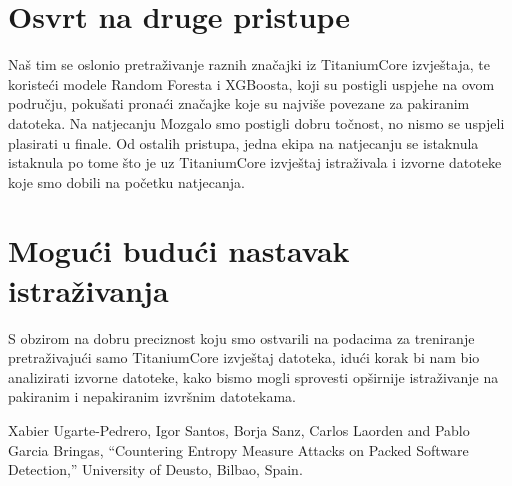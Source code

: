 \documentclass[conference]{IEEEtran}
\begin{document}
\section{Osvrt na druge pristupe}
Naš tim se oslonio pretraživanje raznih značajki iz TitaniumCore izvještaja, te koristeći modele Random Foresta i XGBoosta, koji su postigli uspjehe na ovom području, pokušati pronaći značajke koje su najviše povezane za pakiranim datoteka. Na natjecanju Mozgalo smo postigli dobru točnost, no nismo se uspjeli plasirati u finale. Od ostalih pristupa, jedna ekipa na natjecanju se istaknula istaknula po tome što je uz TitaniumCore izvještaj istraživala i  izvorne datoteke koje smo dobili na početku natjecanja.
\section{Mogući budući nastavak istraživanja}
S obzirom na dobru preciznost koju smo ostvarili na podacima za treniranje pretraživajući samo TitaniumCore izvještaj datoteka, idući korak bi nam bio analizirati izvorne datoteke, kako bismo mogli sprovesti opširnije istraživanje na pakiranim i nepakiranim izvršnim datotekama.

\begin{thebibliography}{00}
 Xabier Ugarte-Pedrero, Igor Santos, Borja Sanz, Carlos Laorden and Pablo Garcia Bringas, ``Countering Entropy Measure Attacks on Packed
Software Detection,'' University of Deusto, Bilbao, Spain.

\end{thebibliography}
\vspace{12pt}
\color{red}
\end{document}
